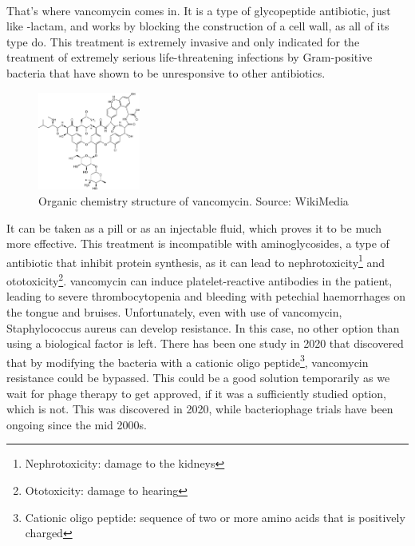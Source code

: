 \paragraph{}That's where vancomycin comes in. It is a type of glycopeptide antibiotic, just like \beta-lactam, and works by blocking the construction of a cell wall, as all of its type do. This treatment is extremely invasive and only indicated for the treatment of extremely serious life-threatening infections by Gram-positive bacteria that have shown to be unresponsive to other antibiotics.\begin{figure}\begin{center}\includegraphics[width=0.30\textwidth]{assets/vancomycin.png}\end{center}\caption{Organic chemistry structure of vancomycin. Source: WikiMedia}\vspace{0.15\linewidth}\end{figure}\newline It can be taken as a pill or as an injectable fluid, which proves it to be much more effective. This treatment is incompatible with aminoglycosides, a type of antibiotic that inhibit protein synthesis, as it can lead to nephrotoxicity\footnote{Nephrotoxicity: damage to the kidneys} and ototoxicity\footnote{Ototoxicity: damage to hearing}. vancomycin can induce platelet-reactive antibodies in the patient, leading to severe thrombocytopenia and bleeding with petechial haemorrhages on the tongue and bruises. Unfortunately, even with use of vancomycin, Staphylococcus aureus can develop resistance. In this case, no other option than using a biological factor is left. There has been one study in 2020 that discovered that by modifying the bacteria with a cationic oligo peptide\footnote{Cationic oligo peptide: sequence of two or more amino acids that is positively charged}, vancomycin resistance could be bypassed. This could be a good solution temporarily as we wait for phage therapy to get approved, if it was a sufficiently studied option, which is not. This was discovered in 2020, while bacteriophage trials have been ongoing since the mid 2000s.
